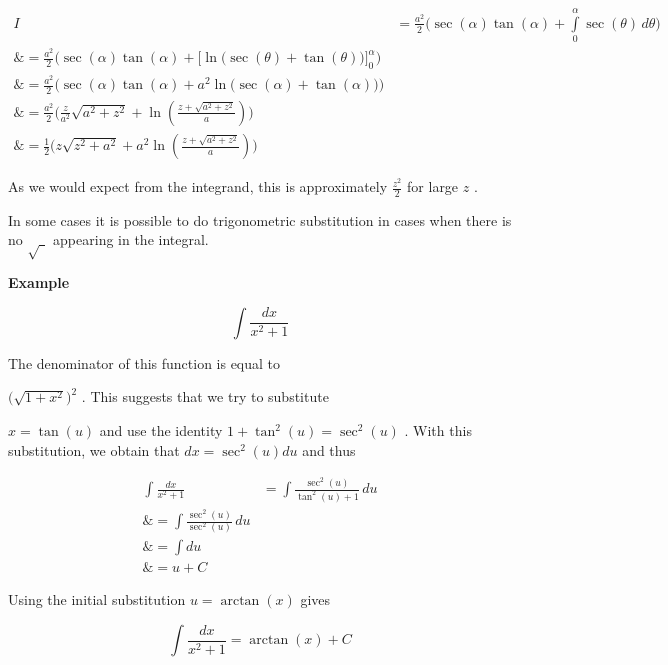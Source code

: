 \begin{align}
I &= \tfrac{a^2}{2}\Bigg(\sec(\alpha)\tan(\alpha) + \int\limits _0^\alpha \sec(\theta)\,d\theta\Bigg) \\\&= \tfrac{a^2}{2}\Bigg(\sec(\alpha)\tan(\alpha) + \bigg[\ln\Big(\sec(\theta) + \tan(\theta)\Big)\bigg] _0^\alpha\Bigg) \\\&= \tfrac{a^2}{2}\bigg(\sec(\alpha)\tan(\alpha) + a^2\ln\Big(\sec(\alpha) + \tan(\alpha)\Big)\bigg) \\\&= \tfrac{a^2}{2}\bigg(\tfrac{z}{a^2}\sqrt{a^2 + z^2} + \ln\left(\tfrac{z + \sqrt{a^2 + z^2}}{a}\right)\bigg) \\\&= \tfrac{1}{2}\bigg(z\sqrt{z^2 + a^2} + a^2\ln\left(\tfrac{z + \sqrt{a^2 + z^2}}{a}\right)\bigg)
\end{align}



As we would expect from the integrand, this is approximately $\frac{z^2}{2}$ for large $z$ .



In some cases it is possible to do trigonometric substitution in cases when there is no $\sqrt{\ \ }$ appearing in the integral.



\textbf{Example}



$$\int\frac{dx}{x^2+1}$$



The denominator of this function is equal to

$\bigl(\sqrt{1+x^2}\bigr)^2$ . This suggests that we try to substitute

$x=\tan(u)$ and use the identity $1+\tan^2(u)=\sec^2(u)$ . With this substitution, we obtain that $dx=\sec^2(u)du$ and thus



\begin{align}
\int\frac{dx}{x^2+1} &= \int\frac{\sec^2(u)}{\tan^2(u)+1}\,du \\\&= \int\frac{\sec^2(u)}{\sec^2(u)}\,du \\\&= \int du \\\&= u + C
\end{align}





Using the initial substitution $u=\arctan(x)$ gives



$$\int\frac{dx}{x^2+1}=\arctan(x)+C$$



